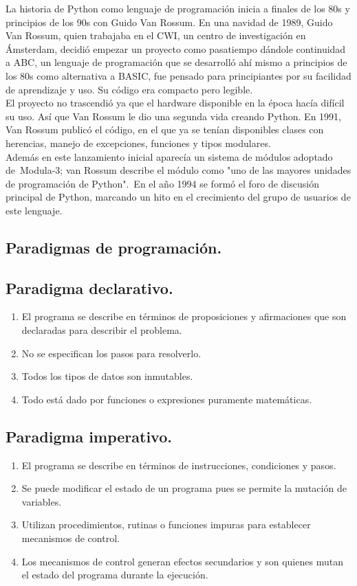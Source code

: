\documentclass{article}
\begin{document}
La historia de Python como lenguaje de programación inicia a finales de los 80s y principios de los 90s con Guido Van Rossum. En una navidad de 1989, Guido Van Rossum, quien trabajaba en el CWI, un centro de investigación en Ámsterdam, decidió empezar un proyecto como pasatiempo dándole continuidad a ABC, un lenguaje de programación que se desarrolló ahí mismo a principios de los 80s como alternativa a BASIC, fue pensado para principiantes por su facilidad de aprendizaje y uso. Su código era compacto pero legible.\\El proyecto no trascendió ya que el hardware disponible en la época hacía difícil su uso. Así que Van Rossum le dio una segunda vida creando Python. En 1991, Van Rossum publicó el código, en el que ya se tenían disponibles clases con herencias, manejo de excepciones, funciones y tipos modulares.\\ Además en este lanzamiento inicial aparecía un sistema de módulos adoptado de Modula-3; van Rossum describe el módulo como "uno de las mayores unidades de programación de Python". En el año 1994 se formó el foro de discusión principal de Python, marcando un hito en el crecimiento del grupo de usuarios de este lenguaje.\\
\begin{center}
	\section*{Paradigmas de programación.}
\end{center}
\subsection*{Paradigma declarativo.}
\begin{enumerate}
	\item El programa se describe en términos de proposiciones y afirmaciones que son declaradas para describir el problema.
	\item No se especifican los pasos para resolverlo.
	\item Todos los tipos de datos son inmutables.
	\item Todo está dado por funciones o expresiones puramente matemáticas.
\end{enumerate}
\subsection*{Paradigma imperativo.}
\begin{enumerate}
	\item El programa se describe en términos de instrucciones, condiciones y pasos.
	\item Se puede modificar el estado de un programa pues se permite la mutación de variables.
	\item Utilizan procedimientos, rutinas o funciones impuras para establecer mecanismos de control.
	\item Los mecanismos de control generan efectos secundarios y son quienes mutan el estado del programa durante la ejecución.
\end{enumerate}
\end{document}
